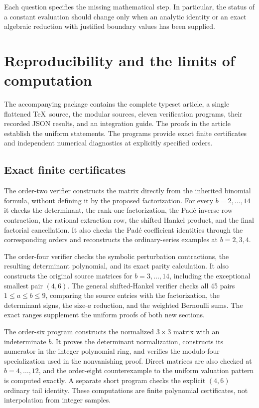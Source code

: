 \documentclass[11pt,a4paper]{article}
\numberwithin{equation}{section}
\theoremstyle{plain}
\theoremstyle{definition}
\theoremstyle{remark}
\begin{document}
Each question specifies the missing mathematical step. In particular,
the status of a constant evaluation should change only when an analytic
identity or an exact algebraic reduction with justified boundary values
has been supplied.



\section{Reproducibility and the limits of computation}
\label{sec:verification}

The accompanying package contains the complete typeset article, a single
flattened \TeX\ source, the modular sources, eleven verification programs,
their recorded JSON results, and an integration guide. The proofs in the
article establish the uniform statements. The programs provide exact
finite certificates and independent numerical diagnostics at explicitly
specified orders.

\subsection{Exact finite certificates}

The order-two verifier constructs the matrix directly from the inherited
binomial formula, without defining it by the proposed factorization.
For every $b=2,\ldots,14$ it checks the determinant, the rank-one
factorization, the Pad\'e inverse-row contraction, the rational extraction
row, the shifted Hankel product, and the final factorial cancellation.
It also checks the Pad\'e coefficient identities through the corresponding
orders and reconstructs the ordinary-series examples at $b=2,3,4$.

The order-four verifier checks the symbolic perturbation contractions,
the resulting determinant polynomial, and its exact parity calculation.
It also constructs the original source matrices for $b=3,\ldots,14$,
including the exceptional smallest pair $(4,6)$. The general shifted-Hankel
verifier checks all 45 pairs $1\le a\le b\le9$, comparing the source
entries with the factorization, the determinant signs, the size-$a$
reduction, and the weighted Bernoulli sums. The exact ranges supplement
the uniform proofs of both new sections.

The order-six program constructs the normalized $3\times3$ matrix with
an indeterminate $b$. It proves the determinant normalization, constructs
its numerator in the integer polynomial ring, and verifies the modulo-four
specialization used in the nonvanishing proof. Direct matrices are also
checked at $b=4,\ldots,12$, and the order-eight counterexample to the
uniform valuation pattern is computed exactly. A separate short program
checks the explicit $(4,6)$ ordinary tail identity. These computations
are finite polynomial certificates, not interpolation from integer samples.
\end{document}
